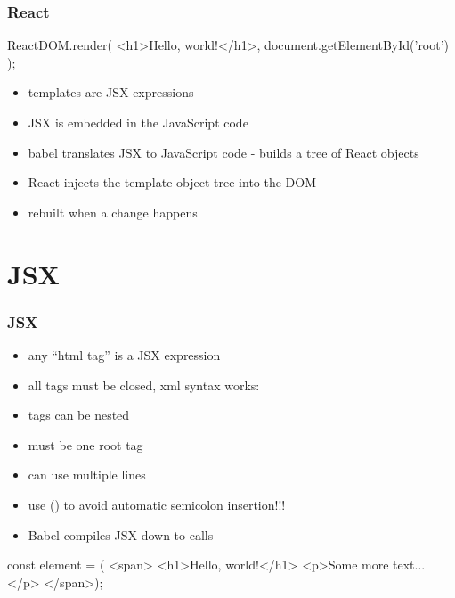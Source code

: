 \begin{frame}[fragile] \frametitle{React}
\begin{CodeBox}{}
ReactDOM.render(
  <h1>Hello, world!</h1>,
  document.getElementById('root')
);
\end{CodeBox}

\vspace{8mm}
\begin{itemize}
  \item templates are JSX expressions
  \item JSX is embedded in the JavaScript code
  \item babel translates JSX to JavaScript code - builds a tree of React objects
  \item React injects the template object tree into the DOM
  \item rebuilt when a change happens
\end{itemize}

\end{frame}

\section{JSX}
\begin{frame}[fragile] \frametitle{JSX}
\begin{itemize}
  \item any ``html tag'' is a JSX expression
  \item all tags must be closed, xml syntax works: 
  \item tags can be nested
  \item must be one root tag
  \item can use multiple lines
  \item use () to avoid automatic semicolon insertion!!!
  \item Babel compiles JSX down to  calls
\end{itemize}

\begin{CodeBox}{}
const element = (
<span>
  <h1>Hello, world!</h1>
  <p>Some more text...</p>
</span>);
\end{CodeBox}
\end{frame}

